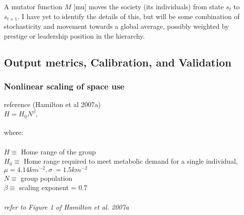 \documentclass[11pt,oneside,a4paper,onecolumn]{article}
\begin{document}
A mutator function $M$ [mu] moves the society (its individuals) from state $s_t$ to $s_{t+1}$.  I have yet to identify the details of this, but will be some combination of stochasticity and movement towards a global average, possibly weighted by prestige or leadership position in the hierarchy.




\subsection{Output metrics, Calibration, and Validation}

\subsubsection{Nonlinear scaling of space use}
reference (Hamilton et al 2007a)\\
$H = H_0N^\beta,$\\
\\
where:\\
\\
$H \equiv$ Home range of the group \\
$H_0 \equiv$ Home range required to meet metabolic demand for a single individual, $\mu = 4.14 km^{-2}, \sigma ~= 1.5 km^{-2}$ \\
$N \equiv$ group population \\
$\beta \equiv$ scaling exponent = 0.7 \\
\\

\textit{refer to Figure 1 of Hamilton et al. 2007a}
\end{document}
